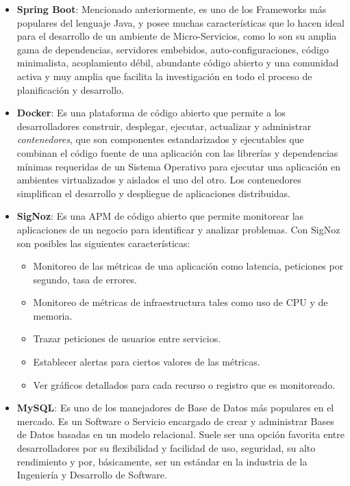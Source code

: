     \begin{itemize}
        \item \textbf{Spring Boot}: Mencionado anteriormente, es uno de los Frameworks más populares del lenguaje Java, y posee muchas características que lo hacen ideal para el desarrollo de un ambiente de Micro-Servicios, como lo son su amplia gama de dependencias, servidores embebidos, auto-configuraciones, código minimalista, acoplamiento débil, abundante código abierto y una comunidad activa y muy amplia que facilita la investigación en todo el proceso de planificación y desarrollo.
        \item \textbf{Docker}: Es una plataforma de código abierto que permite a los desarrolladores construir, desplegar, ejecutar, actualizar y administrar \textit{contenedores}, que son componentes estandarizados y ejecutables que combinan el código fuente de una aplicación con las librerías y dependencias mínimas requeridas de un Sistema Operativo para ejecutar una aplicación en ambientes virtualizados y aislados el uno del otro. Los contenedores simplifican el desarrollo y despliegue de aplicaciones distribuidas.\cite{docker}
        \item \textbf{SigNoz}: Es una APM de código abierto que permite monitorear las aplicaciones de un negocio para identificar y analizar problemas. Con SigNoz son posibles las siguientes características:
        \begin{itemize}
            \item Monitoreo de las métricas de una aplicación como latencia, peticiones por segundo, tasa de errores.
            \item Monitoreo de métricas de infraestructura tales como uso de CPU y de memoria.
            \item Trazar peticiones de usuarios entre servicios.
            \item Establecer alertas para ciertos valores de las métricas.
            \item Ver gráficos detallados para cada recurso o registro que es monitoreado.\cite{signoz}
        \end{itemize}
        \item \textbf{MySQL}: Es uno de los manejadores de Base de Datos más populares en el mercado. Es un Software o Servicio encargado de crear y administrar Bases de Datos basadas en un modelo relacional. Suele ser una opción favorita entre desarrolladores por su flexibilidad y facilidad de uso, seguridad, su alto rendimiento y por, básicamente, ser un estándar en la industria de la Ingeniería y Desarrollo de Software.\cite{mysql}
    \end{itemize}
    
\pagestyle{fancy}
